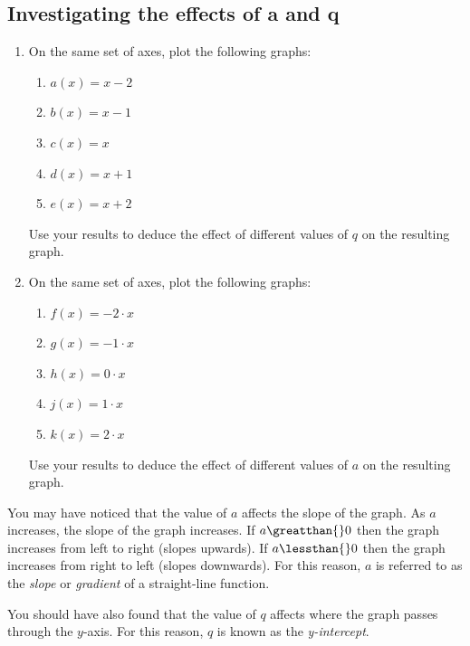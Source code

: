 \subsection*{Investigating the effects of a and q}
\nopagebreak
\label{m39338*id237639}\begin{enumerate}[noitemsep, label=\textbf{\arabic*}. ] 
\label{m39338*uid70}\item On the same set of axes, plot the following graphs:
\label{m39338*id237654}\begin{enumerate}[noitemsep, label=\textbf{\alph*}. ] 
\label{m39338*uid71}\item $a\left(x\right)=x-2$\label{m39338*uid72}\item $b\left(x\right)=x-1$\label{m39338*uid73}\item $c\left(x\right)=x$\label{m39338*uid74}\item $d\left(x\right)=x+1$\label{m39338*uid75}\item $e\left(x\right)=x+2$\end{enumerate}
Use your results to deduce the effect of different values of $q$ on the resulting graph.
\label{m39338*uid76}\item On the same set of axes, plot the following graphs:
\label{m39338*id237854}\begin{enumerate}[noitemsep, label=\textbf{\alph*}. ] 
\label{m39338*uid77}\item $f\left(x\right)=-2\ensuremath{\cdot}x$\label{m39338*uid78}\item $g\left(x\right)=-1\ensuremath{\cdot}x$\label{m39338*uid79}\item $h\left(x\right)=0\ensuremath{\cdot}x$\label{m39338*uid80}\item $j\left(x\right)=1\ensuremath{\cdot}x$\label{m39338*uid81}\item $k\left(x\right)=2\ensuremath{\cdot}x$\end{enumerate}
Use your results to deduce the effect of different values of $a$ on the resulting graph.
\end{enumerate}
\label{m39338*id238062}You may have noticed that the value of $a$ affects the slope of the graph. As $a$ increases, the slope of the graph increases. If $a\greatthan{}0$ then the graph increases from left to right (slopes upwards). If $a\lessthan{}0$ then the graph increases from right to left (slopes downwards). For this reason, $a$ is referred to as the \textsl{slope} or \textsl{gradient} of a straight-line function.\par 
\label{m39338*id238136}You should have also found that the value of $q$ affects where the graph passes through the $y$-axis. For this reason, $q$ is known as the \textsl{y-intercept}.\par 
